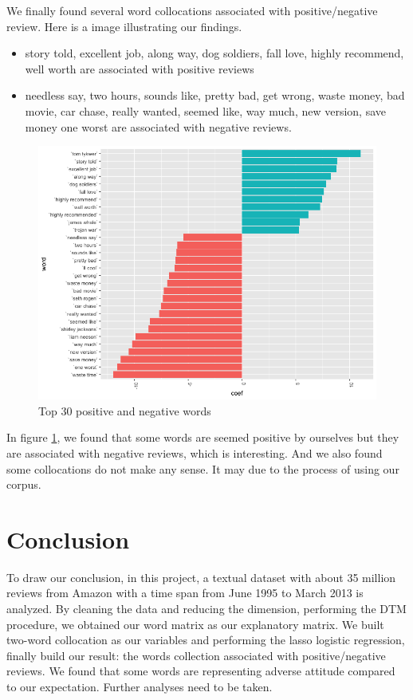 \documentclass[12pt]{article}
\begin{document}
We finally found several word collocations associated with positive/negative review. Here is a image illustrating our findings. 

\begin{itemize}
	\item  story told, excellent job, along way, dog soldiers, fall love, highly recommend, well worth are associated with positive reviews
	\item needless say, two hours, sounds like, pretty bad, get wrong, waste money, bad movie, car chase, really wanted, seemed like, way much, new version, save money one worst are associated with negative reviews.
\end{itemize}

\begin{figure}
	\centering
	\includegraphics[scale=0.5]{../Image/Top_30_positive_and_negative_words.png}
	\caption{Top 30 positive and negative words}
	\label{fig:1}
\end{figure}

In figure \ref{fig:1}, we found that some words are seemed positive by ourselves but they are associated with negative reviews, which is interesting. And we also found some collocations do not make any sense. It may due to the process of using our corpus.



\section{Conclusion}
To draw our conclusion, in this project, a textual dataset with about 35 million reviews from Amazon  with a time span from June 1995 to March 2013 is analyzed. By cleaning the data and reducing the dimension, performing the DTM procedure, we obtained our word matrix as our explanatory matrix. We built two-word collocation as our variables and performing the lasso logistic regression, finally build our result: the words collection associated with positive/negative reviews. We found that some words are representing adverse attitude compared to our expectation. Further analyses need to be taken.



%
%
\end{document}
